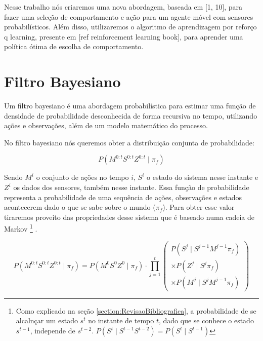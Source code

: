 Nesse trabalho nós criaremos uma nova abordagem, baseada em [1, 10], para fazer uma seleção de comportamento e ação para um agente móvel com sensores probabilísticos. Além disso, utilizaremos o algoritmo de aprendizagem por reforço q learning, presente em [ref reinforcement learning book], para aprender uma política ótima de escolha de comportamento.


\section{Filtro Bayesiano} \label{section:FiltroBayesiano}

Um filtro bayesiano é uma abordagem probabilística para estimar uma função de densidade de probabilidade desconhecida de forma recursiva no tempo, utilizando ações e observações, além de um modelo matemático do processo.

No filtro bayesiano nós queremos obter a distribuição conjunta de probabilidade:

\begin{equation}
	P ( M^{0: t} S^{0: t} Z^{0: t} \mid \pi_f )
\end{equation}

Sendo $ M^i $ o conjunto de ações no tempo $ i $, $ S^i $ o estado do sistema nesse instante e $ Z^i $ os dados dos sensores, também nesse instante. Essa função de probabilidade representa a probabilidade de uma sequência de ações, observações e estados acontecerem dado o que se sabe sobre o mundo ($ \pi_f $). Para obter esse valor tiraremos proveito das propriedades desse sistema que é baseado numa cadeia de Markov%
\footnote{Como explicado na seção \ref{section:RevisaoBibliografica}, a probabilidade de se alcalnçar um estado $ s^t $ no instante de tempo $ t $, dado que se conhece o estado $ s^{t-1} $, independe de $ s^{t-2} $. $ P(S^t\mid S^{t-1}S^{t-2})=P(S^t\mid S^{t-1}) $%
}%
.

\begin{equation}
        P ( M^{0: t} S^{0: t} Z^{0: t} \mid \pi_f ) = P ( M^0 S^0 Z^0 \mid \pi_f ) \cdot \prod\limits_{j =1}^{t} 
        \left(
            \begin{array}{l}
                P( S^j \mid S^{j -1} M^{j -1} \pi_f ) \\
                \times P( Z^j \mid S^j \pi_f ) \\
                \times P( M^j \mid S^j M^{j -1} \pi_f )
            \end{array}
        \right)
\end{equation}

